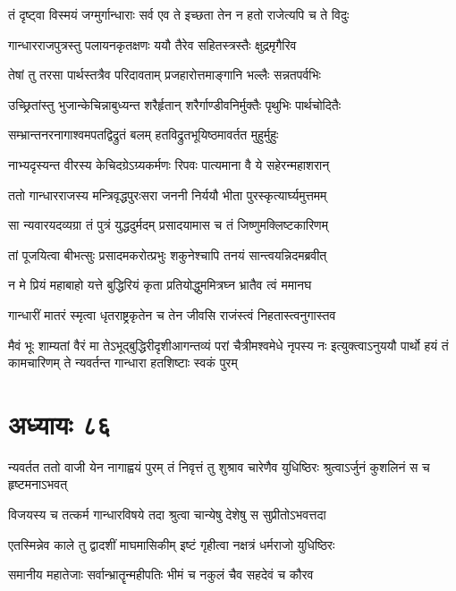 \twolineshloka
{तं दृष्ट्वा विस्मयं जग्मुर्गान्धाराः सर्व एव ते}
{इच्छता तेन न हतो राजेत्यपि च ते विदुः}


\threelineshloka
{गान्धारराजपुत्रस्तु पलायनकृतक्षणः}
{ययौ तैरेव सहितस्त्रस्तैः क्षुद्रमृगैरिव}
{}


\twolineshloka
{तेषां तु तरसा पार्थस्तत्रैव परिदावताम्}
{प्रजहारोत्तमाङ्गानि भल्लैः सन्नतपर्वभिः}


\twolineshloka
{उच्छ्रितांस्तु भुजान्केचिन्नाबुध्यन्त शरैर्हृतान्}
{शरैर्गाण्डीवनिर्मुक्तैः पृथुभिः पार्थचोदितैः}


\twolineshloka
{सम्भ्रान्तनरनागाश्वमपतद्विद्रुतं बलम्}
{हतविद्रुतभूयिष्ठमावर्तत मुहुर्मुहुः}


\twolineshloka
{नाभ्यदृस्यन्त वीरस्य केचिदग्रेऽग्र्यकर्मणः}
{रिपवः पात्यमाना वै ये सहेरन्महाशरान्}


\twolineshloka
{ततो गान्धारराजस्य मन्त्रिवृद्धपुरःसरा}
{जननी निर्ययौ भीता पुरस्कृत्यार्घ्यमुत्तमम्}


\twolineshloka
{सा न्यवारयदव्यग्रा तं पुत्रं युद्धदुर्मदम्}
{प्रसादयामास च तं जिष्णुमक्लिष्टकारिणम्}


\twolineshloka
{तां पूजयित्वा बीभत्सुः प्रसादमकरोत्प्रभुः}
{शकुनेश्चापि तनयं सान्त्वयन्निदमब्रवीत्}


\twolineshloka
{न मे प्रियं महाबाहो यत्ते बुद्धिरियं कृता}
{प्रतियोद्धुममित्रघ्न भ्रातैव त्वं ममानघ}


\twolineshloka
{गान्धारीं मातरं स्मृत्वा धृतराष्ट्रकृतेन च}
{तेन जीवसि राजंस्त्वं निहतास्त्वनुगास्तव}


मैवं भूः शाम्यतां वैरं मा तेऽभूद्बुद्धिरीदृशीआगन्तव्यं परां चैत्रीमश्वमेधे नृपस्य नः
\twolineshloka
{इत्युक्त्वाऽनुययौ पार्थो हयं तं कामचारिणम्}
{ते न्यवर्तन्त गान्धारा हतशिष्टाः स्वकं पुरम्}


\chapter{अध्यायः ८६}
\threelineshloka
{न्यवर्तत ततो वाजी येन नागाह्वयं पुरम्}
{तं निवृत्तं तु शुश्राव चारेणैव युधिष्ठिरः}
{श्रुत्वाऽर्जुनं कुशलिनं स च हृष्टमनाऽभवत्}


\twolineshloka
{विजयस्य च तत्कर्म गान्धारविषये तदा}
{श्रुत्वा चान्येषु देशेषु स सुप्रीतोऽभवत्तदा}


\twolineshloka
{एतस्मिन्नेव काले तु द्वादशीं माघमासिकीम्}
{इष्टं गृहीत्वा नक्षत्रं धर्मराजो युधिष्ठिरः}


\twolineshloka
{समानीय महातेजाः सर्वान्भ्रातॄन्महीपतिः}
{भीमं च नकुलं चैव सहदेवं च कौरव}


